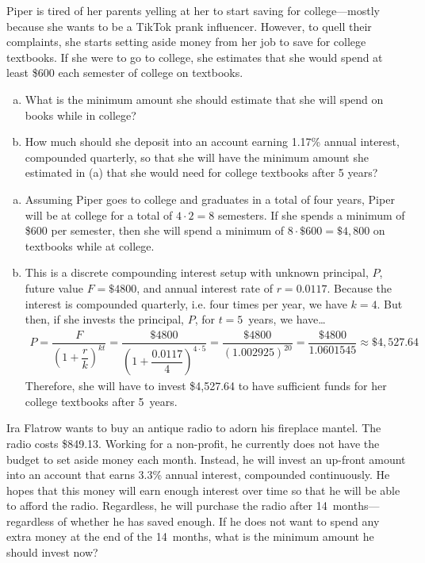 \documentclass[11pt,letterpaper]{article}
\begin{document}
\newpage



 Piper is tired of her parents yelling at her to start saving for college---mostly because she wants to be a TikTok prank influencer. However, to quell their complaints, she starts setting aside money from her job to save for college textbooks. If she were to go to college, she estimates that she would spend at least \$600 each semester of college on textbooks. 
	\begin{enumerate}[(a)]
	\item What is the minimum amount she should estimate that she will spend on books while in college? 
	\item How much should she deposit into an account earning 1.17\% annual interest, compounded quarterly, so that she will have the minimum amount she estimated in (a) that she would need for college textbooks after 5 years? 
	\end{enumerate} \pspace

\sol 
\begin{enumerate}[(a)]
\item Assuming Piper goes to college and graduates in a total of four years, Piper will be at college for a total of $4 \cdot 2= 8$ semesters. If she spends a minimum of \$600 per semester, then she will spend a minimum of $8 \cdot \$600= \$4,800$ on textbooks while at college. \pspace

\item This is a discrete compounding interest setup with unknown principal, $P$, future value $F= \$4800$, and annual interest rate of $r= 0.0117$. Because the interest is compounded quarterly, i.e. four times per year, we have $k= 4$. But then, if she invests the principal, $P$, for $t= 5$~years, we have\dots
	\[
	\begin{aligned}
	P= \dfrac{F}{\left(1 + \dfrac{r}{k} \right)^{kt}}= \dfrac{\$4800}{\left(1 + \dfrac{0.0117}{4} \right)^{4 \cdot 5}}= \dfrac{\$4800}{(1.002925)^{20}}= \dfrac{\$4800}{1.0601545} \approx \$4,\!527.64
	\end{aligned}
	\]
Therefore, she will have to invest \$4,527.64 to have sufficient funds for her college textbooks after 5~years. 
\end{enumerate}



\newpage



 Ira Flatrow wants to buy an antique radio to adorn his fireplace mantel. The radio costs \$849.13. Working for a non-profit, he currently does not have the budget to set aside money each month. Instead, he will invest an up-front amount into an account that earns 3.3\% annual interest, compounded continuously. He hopes that this money will earn enough interest over time so that he will be able to afford the radio. Regardless, he will purchase the radio after 14~months---regardless of whether he has saved enough. If he does not want to spend any extra money at the end of the 14~months, what is the minimum amount he should invest now? \pspace
\end{document}
